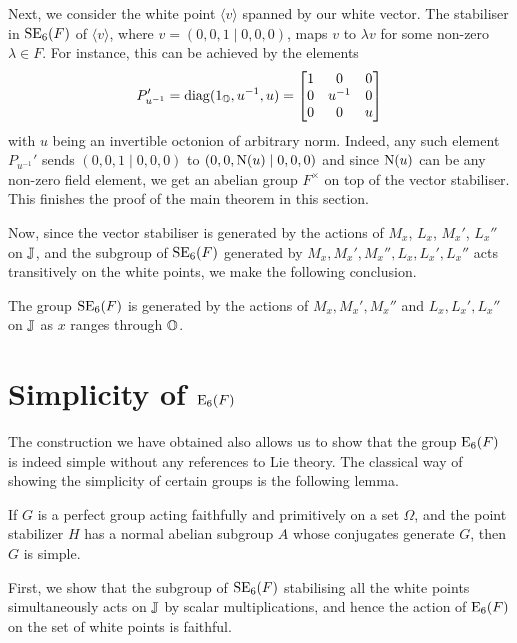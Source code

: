 Next, we consider the white point $\langle v \rangle$ spanned by our white vector. The stabiliser
in $\mathrm{SE}_6(F)$ of $\langle v \rangle$, where $v = (0,0,1\mid 0,0,0)$, maps 
$v$ to $\lambda v$ for some non-zero 
$\lambda \in F$. For instance, this can be achieved by the elements 
\begin{equation}
	\label{eq:puprime}
	P_{u^{-1}}' = \mathrm{diag}(1_{\mathbb{O}},u^{-1},u) = \begin{bmatrix}
		1 & 0 & 0 \\
		0 & u^{-1} & 0 \\
		0 & 0 & u
	\end{bmatrix}	 
\end{equation}
with 
$u$ being an invertible octonion of arbitrary norm. 
Indeed, any such element $P_{u^{-1}}'$ sends
$(0,0,1\mid 0,0,0)$ to $(0,0,\mathord{\mathrm{N}}(u)\mid 0,0,0)$ and since $\mathord{\mathrm{N}}(u)$ can be any non-zero 
field element, we get an abelian group $F^{\times}$ on top of the vector stabiliser. This finishes
the proof of the main theorem in this section. 

Now, since the vector stabiliser is generated by the actions of $M_x$, $L_x$, $M_x'$,
$L_x''$ on $\mathbb{J}$, and the subgroup of $\mathrm{SE}_6(F)$ generated by 
$M_x,M_x',M_x'',L_x,L_x',L_x''$ acts transitively on the white points, 
we make the following conclusion. 

\begin{theorem}
The group $\mathrm{SE}_6(F)$ is generated by the actions
of $M_x,M_x',M_x''$ and $L_x,L_x',L_x''$ on $\mathbb{J}$ as $x$ ranges through $\mathbb{O}$. 
\end{theorem}

\section{Simplicity of $\mathord{\mathrm{E}}_6(F)$}

The construction we have obtained also allows us to show that the group $\mathord{\mathrm{E}}_6(F)$ is indeed
simple without any references to Lie theory. The classical way of showing the simplicity of 
certain groups is the following lemma.

\begin{lemma}[Iwasawa]
    If $G$ is a perfect group acting faithfully and primitively 
    on a set $\Omega$, and the point stabilizer $H$ has a normal
    abelian subgroup $A$ whose conjugates generate $G$, then
    $G$ is simple.
\end{lemma}

First, we show that the subgroup of $\mathrm{SE}_6(F)$ stabilising 
all the white points simultaneously acts on $\mathbb{J}$ by scalar multiplications, and hence
the action of $\mathrm{E}_6(F)$ on the set of white points is faithful.

